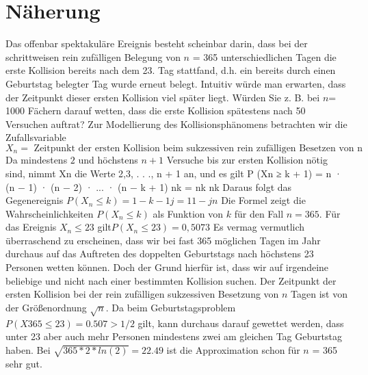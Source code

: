 \documentclass[11pt]{article}
\begin{document}
    \section{Näherung}
    \newline
    Das offenbar spektakuläre Ereignis besteht scheinbar darin, dass bei der schrittweisen rein zufälligen Belegung
    von \(n\) = 365 unterschiedlichen Tagen die erste Kollision bereits nach dem 23. Tag stattfand, d.h. ein bereits
    durch einen Geburtstag belegter Tag wurde erneut belegt. Intuitiv würde man erwarten, dass der Zeitpunkt dieser
    ersten Kollision viel später liegt. Würden Sie z. B. bei \(n\)= 1000 Fächern darauf wetten, dass die erste Kollision
    spätestens nach 50 Versuchen auftrat?
    \newline
    Zur Modellierung des Kollisionsphänomens betrachten wir die Zufallsvariable
    \newline
    \[{ X_{n} = \text{ Zeitpunkt der ersten Kollision beim sukzessiven rein zufälligen Besetzen von n Tagen. } }\]
    \newline
    Da mindestens \(2\) und höchstens \(n + 1\) Versuche bis zur ersten Kollision nötig sind, nimmt Xn die Werte 2,3, . . ., n + 1 an, und es gilt P (Xn ≥ k + 1) = n · (n − 1) · (n − 2) · ... · (n − k + 1) nk = nk nk
    \newline\newline
    Daraus folgt das Gegenereignis
    \newline\newline
    \(P (X_{n} ≤ k)=1 − k −1 j=1 1 − j n \)
    \newline
    Die Formel zeigt die Wahrscheinlichkeiten \(P(X_{n} \leq k)\) als Funktion von \(k\) für den Fall \(n = 365\).
    Für das Ereignis \({X_{n} \leq 23}\) gilt\( P(X_{n} \leq 23) = 0,5073 \)
    \newline
    \newline
    Es vermag vermutlich überraschend zu erscheinen, dass wir bei fast 365 möglichen Tagen im Jahr durchaus auf das
    Auftreten des doppelten Geburtstags nach höchstens 23 Personen wetten können. Doch der Grund hierfür ist, dass wir
    auf irgendeine beliebige und nicht nach einer bestimmten Kollision suchen.
    Der Zeitpunkt der ersten Kollision bei der rein zufälligen sukzessiven Besetzung von \(n\) Tagen ist von
    der Größenordnung \(\sqrt{n}\).
    \newline
    \newline
    Da beim Geburtstagsproblem  \(P (X365 \leq 23) = 0.507 > 1/2\) gilt, kann durchaus darauf gewettet werden,
    dass unter 23 aber auch mehr Personen mindestens zwei am gleichen Tag Geburtstag haben. Bei
    \(\sqrt{365 * 2 * ln(2)} = 22.49\)
    ist die Approximation schon für \(n\) = 365 sehr gut.
\end{document}
